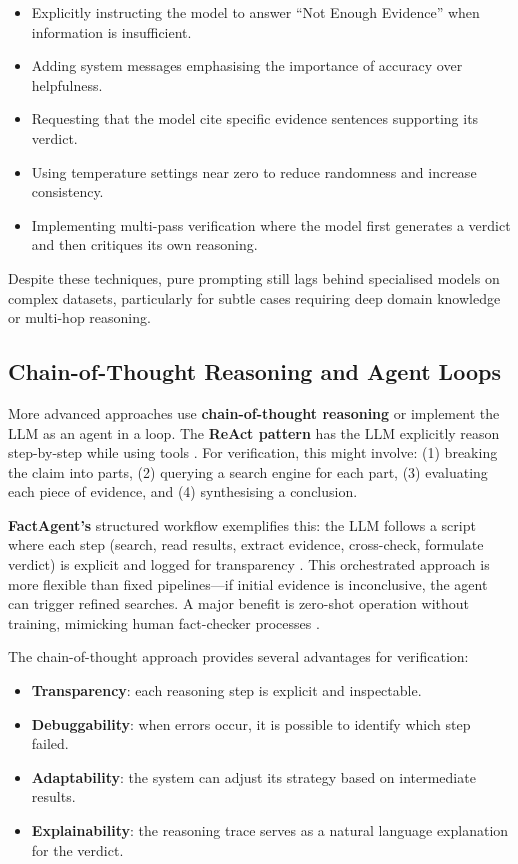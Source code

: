 \documentclass[12pt,a4paper]{article}
\begin{document}
\begin{itemize}
    \item Explicitly instructing the model to answer ``Not Enough Evidence'' when information is insufficient.
    \item Adding system messages emphasising the importance of accuracy over helpfulness.
    \item Requesting that the model cite specific evidence sentences supporting its verdict.
    \item Using temperature settings near zero to reduce randomness and increase consistency.
    \item Implementing multi-pass verification where the model first generates a verdict and then critiques its own reasoning.
\end{itemize}

Despite these techniques, pure prompting still lags behind specialised models on complex datasets, particularly for subtle cases requiring deep domain knowledge or multi-hop reasoning.

\subsection{Chain-of-Thought Reasoning and Agent Loops}

More advanced approaches use \textbf{chain-of-thought reasoning} or implement the LLM as an agent in a loop. The \textbf{ReAct pattern} has the LLM explicitly reason step-by-step while using tools \citep{yao2023react}. For verification, this might involve: (1) breaking the claim into parts, (2) querying a search engine for each part, (3) evaluating each piece of evidence, and (4) synthesising a conclusion.

\textbf{FactAgent's} structured workflow exemplifies this: the LLM follows a script where each step (search, read results, extract evidence, cross-check, formulate verdict) is explicit and logged for transparency \citep{hysonlab2025factagent}. This orchestrated approach is more flexible than fixed pipelines—if initial evidence is inconclusive, the agent can trigger refined searches. A major benefit is zero-shot operation without training, mimicking human fact-checker processes \citep{hysonlab2025factagent}.

The chain-of-thought approach provides several advantages for verification:

\begin{itemize}
    \item \textbf{Transparency}: each reasoning step is explicit and inspectable.
    \item \textbf{Debuggability}: when errors occur, it is possible to identify which step failed.
    \item \textbf{Adaptability}: the system can adjust its strategy based on intermediate results.
    \item \textbf{Explainability}: the reasoning trace serves as a natural language explanation for the verdict.
\end{itemize}
\end{document}
